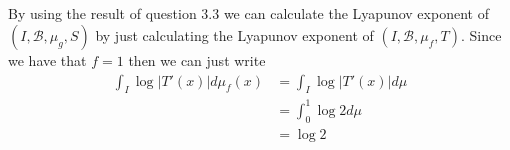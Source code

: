 \documentclass{unswmaths}
\begin{document}
\subsection{}
By using the result of question 3.3 we can calculate the  Lyapunov exponent of $ (I, \mathcal{B}, \mu_g, S) $ by just calculating the  Lyapunov exponent of $ (I, \mathcal{B}, \mu_f, T ) $. Since we have that $ f = 1 $ then we can just write
\begin{align}
  \int_{I} \log |T'(x)| d\mu_f(x) &= \int_{I} \log |T'(x)| d\mu \\
    &= \int_{0}^{1} \log 2 d\mu \\
    &= \log 2
\end{align}
\end{document}
